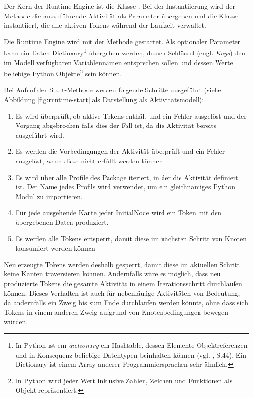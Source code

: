 
Der Kern der Runtime Engine ist die Klasse . Bei der Instantiierung wird der  Methode die auszuführende Aktivität als Parameter übergeben und die Klasse  instantiiert, die alle aktiven Tokens während der Laufzeit verwaltet.

Die Runtime Engine wird mit der Methode  gestartet. Als optionaler Parameter kann ein Daten Dictionary\footnote
{In Python ist ein \emph{dictionary} ein Hashtable, dessen Elemente Objektreferenzen und in Konsequenz beliebige Datentypen beinhalten können (vgl. \citep{Martelli2006}, S.44). Ein Dictionary ist einem Array anderer Programmiersprachen sehr ähnlich.}
übergeben werden, dessen Schlüssel (engl. \emph{Keys}) den im Modell verfügbaren Variablennamen entsprechen sollen und dessen Werte beliebige Python Objekte\footnote{In Python wird jeder Wert inklusive Zahlen, Zeichen und Funktionen als Objekt repräsentiert.}
sein können.


Bei Aufruf der Start-Methode werden folgende Schritte ausgeführt (siehe Abbildung \ref{fig:runtime-start} als Darstellung als Aktivitätsmodell):
\begin{enumerate}
\item Es wird überprüft, ob  aktive Tokens enthält und ein Fehler ausgelöst und der Vorgang abgebrochen falls dies der Fall ist, da die Aktivität bereits ausgeführt wird.
\item Es werden die Vorbedingungen der Aktivität überprüft und ein Fehler ausgelöst, wenn diese nicht erfüllt werden können.
\item Es wird über alle Profile des Package iteriert, in der die Aktivität definiert ist. Der Name jedes Profils wird verwendet, um ein gleichnamiges Python Modul zu importieren.
\item Für jede ausgehende Kante jeder InitialNode wird ein Token mit den übergebenen Daten produziert.
\item Es werden alle Tokens entsperrt, damit diese im nächsten Schritt von Knoten konsumiert werden können
\end{enumerate}

Neu erzeugte Tokens werden deshalb gesperrt, damit diese im aktuellen Schritt keine Kanten traversieren können. Andernfalls wäre es möglich, dass neu produzierte Tokens die gesamte Aktivität in einem Iterationsschritt durchlaufen können. Dieses Verhalten ist auch für nebenläufige Aktivitäten von Bedeutung, da andernfalls ein Zweig bis zum Ende durchlaufen werden könnte, ohne dass sich Tokens in einem anderen Zweig aufgrund von Knotenbedingungen bewegen würden.

